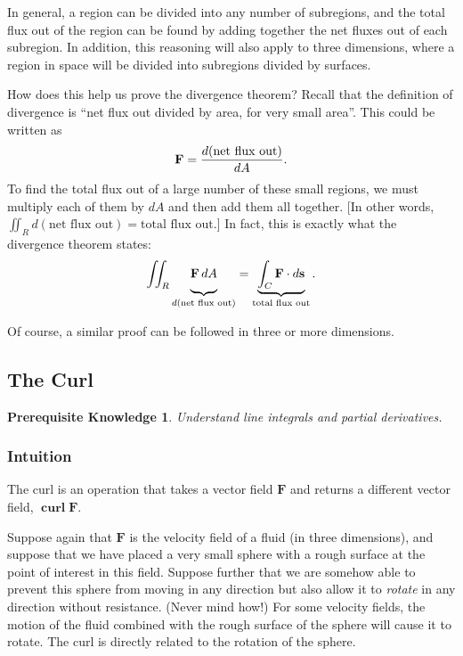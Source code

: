 \documentclass{myarticle}
\let\div\relax
\DeclareMathOperator{\div}{div}
\DeclareMathOperator{\curl}{\mathbf{curl}}
\renewcommand{\vec}[1]{\mathbf{#1}}
\theoremstyle{nospace}
\newtheorem*{oldprereq}{Prerequisite Knowledge}
\newenvironment{prereq}{\begin{mdframed}\begin{oldprereq}}{\end{oldprereq}\end{mdframed}}
\newtheorem{old series theorem}{Theorem}
\newenvironment{series theorem}{\begin{mdframed}\begin{old series theorem}}{\end{old series theorem}\end{mdframed}}
\begin{document}
In general, a region can be divided into any number of subregions, and the total flux out of the region can be found by adding together the net fluxes out of each subregion. In addition, this reasoning will also apply to three dimensions, where a region in space will be divided into subregions divided by surfaces.

How does this help us prove the divergence theorem? Recall that the definition of divergence is ``net flux out divided by area, for very small area''. This could be written as \[ \div \vec{F} = \frac{d(\text{net flux out})}{dA}. \] To find the total flux out of a large number of these small regions, we must multiply each of them by $dA$ and then add them all together. [In other words, $\iint_R d(\text{net flux out}) = \text{total flux out}$.] In fact, this is exactly what the divergence theorem states: \[ \iint_R \underbrace{\div \vec{F} \,dA\vphantom{\int}}_{d(\text{net flux out})} = \underbrace{\int_C \vec{F} \cdot d\vec{s}}_\text{total flux out}. \]

Of course, a similar proof can be followed in three or more dimensions.

\subsection{The Curl} \label{sec:curl}

\begin{prereq} Understand line integrals and partial derivatives. \end{prereq}

\subsubsection{Intuition} \label{sec:curl intuition}

The curl is an operation that takes a vector field $\vec{F}$ and returns a different vector field, $\curl \vec{F}$.

Suppose again that $\vec{F}$ is the velocity field of a fluid (in three dimensions), and suppose that we have placed a very small sphere with a rough surface at the point of interest in this field. Suppose further that we are somehow able to prevent this sphere from moving in any direction but also allow it to \textit{rotate} in any direction without resistance. (Never mind how!) For some velocity fields, the motion of the fluid combined with the rough surface of the sphere will cause it to rotate. The curl is directly related to the rotation of the sphere.
\end{document}
